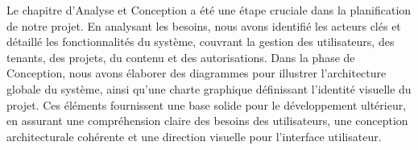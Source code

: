 \hspace{\parindent}Le chapitre d'Analyse et Conception a été une étape cruciale dans la planification de notre projet. En analysant les besoins, nous avons identifié les acteurs clés et détaillé les fonctionnalités du système, couvrant la gestion des utilisateurs, des tenants, des projets, du contenu et des autorisations. Dans la phase de Conception, nous avons élaborer des diagrammes pour illustrer l'architecture globale du système, ainsi qu'une charte graphique définissant l'identité visuelle du projet. Ces éléments fournissent une base solide pour le développement ultérieur, en assurant une compréhension claire des besoins des utilisateurs, une conception architecturale cohérente et une direction visuelle pour l'interface utilisateur.


























